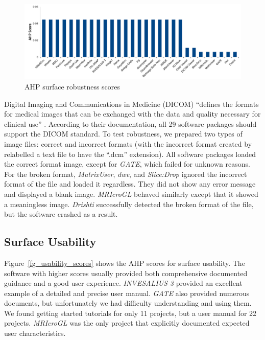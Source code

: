 \documentclass[11pt]{article}
\begin{document}
\begin{figure}[!ht]
\includegraphics[scale=0.47]{robustness_scores.pdf}
\caption{AHP surface robustness scores}
\label{fg_robustness_scores}
\end{figure}

Digital Imaging and Communications in Medicine (DICOM) ``defines the formats for
medical images that can be exchanged with the data and quality necessary for
clinical use'' \citep{MITA2021}. According to their documentation, all 29
software packages should support the DICOM standard. To test robustness, we
prepared two types of image files: correct and incorrect formats (with the
incorrect format created by relabelled a text file to have the ``.dcm''
extension).  All software packages loaded the correct format image, except for
\textit{GATE}, which failed for unknown reasons.  For the broken format,
\textit{MatrixUser}, \textit{dwv}, and \textit{Slice:Drop} ignored the incorrect
format of the file and loaded it regardless. They did not show any error message
and displayed a blank image. \textit{MRIcroGL} behaved similarly except that it
showed a meaningless image. \textit{Drishti} successfully detected the broken
format of the file, but the software crashed as a result.

\subsection{Surface Usability} \label{sec_result_usability}

Figure~\ref{fg_usability_scores} shows the AHP scores for surface usability. The
software with higher scores usually provided both comprehensive documented
guidance and a good user experience. \textit{INVESALIUS 3} provided an excellent
example of a detailed and precise user manual. \textit{GATE} also provided
numerous documents, but unfortunately we had difficulty understanding and using
them. We found getting started tutorials for only 11 projects, but a user manual
for 22 projects. \textit{MRIcroGL} was the only project that explicitly
documented expected user characteristics.
\end{document}
